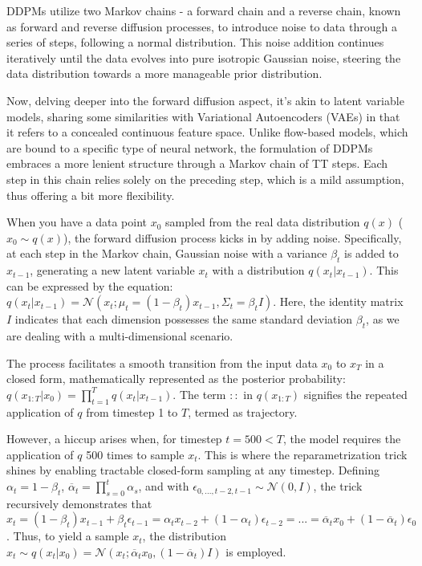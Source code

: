 DDPMs utilize two Markov chains - a forward chain and a reverse chain, known as forward and reverse diffusion processes, to introduce noise to data through a series of steps, following a normal distribution. This noise addition continues iteratively until the data evolves into pure isotropic Gaussian noise, steering the data distribution towards a more manageable prior distribution.

Now, delving deeper into the forward diffusion aspect, it's akin to latent variable models, sharing some similarities with Variational Autoencoders (VAEs) in that it refers to a concealed continuous feature space. Unlike flow-based models, which are bound to a specific type of neural network, the formulation of DDPMs embraces a more lenient structure through a Markov chain of TT steps. Each step in this chain relies solely on the preceding step, which is a mild assumption, thus offering a bit more flexibility.

When you have a data point \( x_0 \) sampled from the real data distribution \( q(x) \) (\( x_0 \sim q(x) \)), the forward diffusion process kicks in by adding noise. Specifically, at each step in the Markov chain, Gaussian noise with a variance \( \beta_t \) is added to \( x_{t-1} \), generating a new latent variable \( x_t \) with a distribution \( q(x_t | x_{t-1}) \). This can be expressed by the equation: \( q(x_t | x_{t-1}) = \mathcal{N}(x_t; \mu_t = (1 - \beta_t)x_{t-1}, \Sigma_t = \beta_t I) \). Here, the identity matrix \( I \) indicates that each dimension possesses the same standard deviation \( \beta_t \), as we are dealing with a multi-dimensional scenario.

The process facilitates a smooth transition from the input data \( x_0 \) to \( x_T \) in a closed form, mathematically represented as the posterior probability: \( q(x_{1:T} | x_0) = \prod_{t=1}^T q(x_t | x_{t-1}) \). The term \( :: \) in \( q(x_{1:T}) \) signifies the repeated application of \( q \) from timestep 1 to \( T \), termed as trajectory.

However, a hiccup arises when, for timestep \( t = 500 < T \), the model requires the application of \( q \) 500 times to sample \( x_t \). This is where the reparametrization trick shines by enabling tractable closed-form sampling at any timestep. Defining \( \alpha_t = 1 - \beta_t \), \( \overline{\alpha}_t = \prod_{s=0}^t \alpha_s \), and with \( \epsilon_{0,...,t-2,t-1} \sim \mathcal{N}(0,I) \), the trick recursively demonstrates that \( x_t = (1 - \beta_t) x_{t-1} + \beta_t \epsilon_{t-1} = \alpha_t x_{t-2} + (1 - \alpha_t) \epsilon_{t-2} = ... = \overline{\alpha}_t x_0 + (1 - \overline{\alpha}_t) \epsilon_0 \). Thus, to yield a sample \( x_t \), the distribution \( x_t \sim q(x_t | x_0) = \mathcal{N}(x_t; \overline{\alpha}_t x_0, (1 - \overline{\alpha}_t) I) \) is employed.

